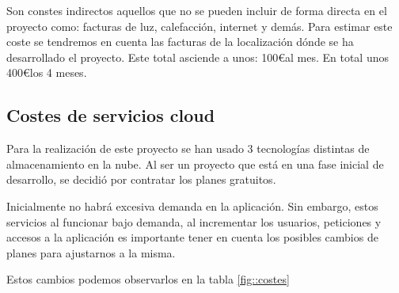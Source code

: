 Son constes indirectos aquellos que no se pueden incluir de forma directa en el proyecto como: facturas de luz, calefacción, internet y demás. Para estimar este coste se tendremos en cuenta las facturas de la localización dónde se ha desarrollado el proyecto. Este total asciende a unos: 100\euro al mes. En total unos 400\euro los 4 meses.

\subsection{Costes de servicios cloud}

Para la realización de este proyecto se han usado 3 tecnologías distintas de almacenamiento en la nube. Al ser un proyecto que está en una fase inicial de desarrollo, se decidió por contratar los planes gratuitos. 

Inicialmente no habrá excesiva demanda en la aplicación. Sin embargo, estos servicios al funcionar bajo demanda, al incrementar los usuarios, peticiones y accesos a la aplicación es importante tener en cuenta los posibles cambios de planes para ajustarnos a la misma. 

Estos cambios podemos observarlos en la tabla \ref{fig::costes}

